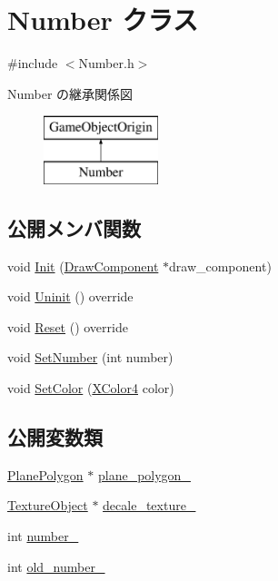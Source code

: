 \hypertarget{class_number}{}\section{Number クラス}
\label{class_number}


{\ttfamily \#include $<$Number.\+h$>$}

Number の継承関係図\begin{figure}[H]
\begin{center}
\leavevmode
\includegraphics[height=2.000000cm]{class_number}
\end{center}
\end{figure}
\subsection*{公開メンバ関数}
\begin{DoxyCompactItemize}
\item 
void \mbox{\hyperlink{class_number_a5830270854ab224b60462f50f495a1fa}{Init}} (\mbox{\hyperlink{class_draw_component}{Draw\+Component}} $\ast$draw\+\_\+component)
\item 
void \mbox{\hyperlink{class_number_a7c3bf9c55f7a0a19d80129c5f07f99f2}{Uninit}} () override
\item 
void \mbox{\hyperlink{class_number_a7c6facdb1b3d0acc8309e0a915863d44}{Reset}} () override
\item 
void \mbox{\hyperlink{class_number_ac825b1ee1f46a6ac4ffd3bc904964745}{Set\+Number}} (int number)
\item 
void \mbox{\hyperlink{class_number_a1ea98cdee888a040f4530a6654657c44}{Set\+Color}} (\mbox{\hyperlink{_vector3_d_8h_a680c30c4a07d86fe763c7e01169cd6cc}{X\+Color4}} color)
\end{DoxyCompactItemize}
\subsection*{公開変数類}
\begin{DoxyCompactItemize}
\item 
\mbox{\hyperlink{class_plane_polygon}{Plane\+Polygon}} $\ast$ \mbox{\hyperlink{class_number_a588084d69c46b02ddb608448724cfe11}{plane\+\_\+polygon\+\_\+}}
\item 
\mbox{\hyperlink{class_texture_object}{Texture\+Object}} $\ast$ \mbox{\hyperlink{class_number_a305385aaec293089117c50fd1cf2575f}{decale\+\_\+texture\+\_\+}}
\item 
int \mbox{\hyperlink{class_number_a8c3235a3442303d4ef950fef5eb7b34c}{number\+\_\+}}
\item 
int \mbox{\hyperlink{class_number_acd5422010e99cbf61196094a9b501115}{old\+\_\+number\+\_\+}}
\end{DoxyCompactItemize}
